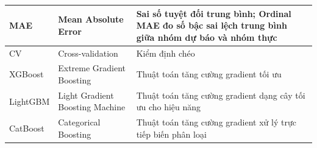 \documentclass[a4paper]{report}
\begin{document}
{\begin{longtable}{|p{2.0cm}|p{4.6cm}|p{6.8cm}|}
MAE & Mean Absolute Error & Sai số tuyệt đối trung bình; Ordinal MAE đo số bậc sai lệch trung bình giữa nhóm dự báo và nhóm thực\\ \hline
CV & Cross-validation & Kiểm định chéo\\ \hline
XGBoost & Extreme Gradient Boosting & Thuật toán tăng cường gradient tối ưu\\ \hline
LightGBM & Light Gradient Boosting Machine & Thuật toán tăng cường gradient dạng cây tối ưu cho hiệu năng\\ \hline
CatBoost & Categorical Boosting & Thuật toán tăng cường gradient xử lý trực tiếp biến phân loại\\ \hline
\end{longtable}
}

\clearpage
\renewcommand{\listtablename}{Danh mục bảng}
\listoftables
{}
\clearpage
\renewcommand{\listfigurename}{Danh mục hình vẽ}
\listoffigures
{}



\clearpage
{}
\setcounter{page}{1}



\newpage









\newpage
{}
{}



\newpage

\end{document}
